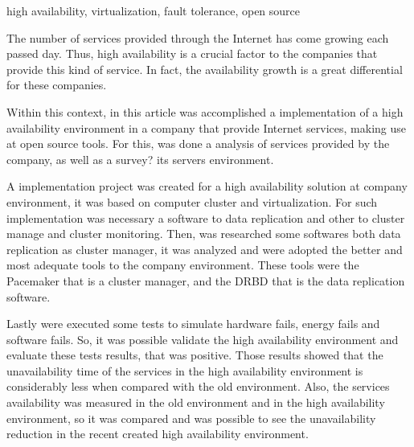 \begin{englishabstract}{}{high availability, virtualization, fault tolerance, open source}

The number of services provided through the Internet has come growing each passed day. Thus, high availability is a crucial factor to the 
companies that provide this kind of service. In fact, the availability growth is a great differential for these companies.

Within this context, in this article was accomplished a implementation of a high availability environment in a company that provide 
Internet services, making use at open source tools. For this, was done a analysis of services provided by the company, 
as well as a survey? its servers environment.

A implementation project was created for a high availability solution at company environment, it was based on computer cluster and virtualization.
For such implementation was necessary a software to data replication and other to cluster manage and cluster monitoring. Then, was researched
some softwares both data replication as cluster manager, it was analyzed and were adopted the better and most adequate tools to the company 
environment. These tools were the Pacemaker that is a cluster manager, and the DRBD that is the data replication software.

Lastly were executed some tests to simulate hardware fails, energy fails and software fails. So, it was possible validate the high availability
environment and evaluate these tests results, that was positive. Those results showed that the unavailability time of the services in the
high availability environment is considerably less when compared with the old environment. Also, the services availability was measured in
the old environment and in the high availability environment, so it was compared and was possible to see the unavailability reduction in the 
recent created high availability environment.

\end{englishabstract}
